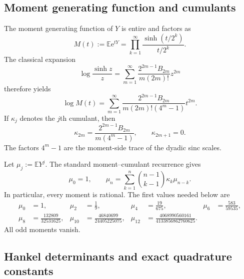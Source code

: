 \documentclass[11pt]{article}
\numberwithin{equation}{section}
\theoremstyle{definition}
\theoremstyle{remark}
\newcommand{\E}{\mathbb E}
\newcommand{\e}{\mathrm e}
\begin{document}
\subsection{Moment generating function and cumulants}

The moment generating function of $Y$ is entire and factors as
\begin{equation}
 M(t):=\E\e^{tY}
 =\prod_{k=1}^{\infty}\frac{\sinh(t/2^k)}{t/2^k}.
 \label{eq:MGF}
\end{equation}
The classical expansion
\begin{equation}
 \log\frac{\sinh z}{z}
 =\sum_{m=1}^{\infty}
 \frac{2^{2m-1}B_{2m}}{m(2m)!}z^{2m}
 \label{eq:logsinh}
\end{equation}
therefore yields
\begin{equation}
 \boxed{
 \log M(t)=\sum_{m=1}^{\infty}
 \frac{2^{2m-1}B_{2m}}{m(2m)!(4^m-1)}t^{2m}.}
 \label{eq:logM}
\end{equation}
If $\kappa_j$ denotes the $j$th cumulant, then
\begin{equation}
 \boxed{
 \kappa_{2m}=\frac{2^{2m-1}B_{2m}}{m(4^m-1)},
 \qquad
 \kappa_{2m+1}=0.}
 \label{eq:cumulants}
\end{equation}
The factors $4^m-1$ are the moment-side trace of the dyadic sinc scales.

Let $\mu_j:=\E Y^j$.  The standard moment--cumulant recurrence gives
\begin{equation}
 \mu_0=1,
 \qquad
 \mu_n=\sum_{k=1}^{n}\binom{n-1}{k-1}\kappa_k\mu_{n-k}.
 \label{eq:moment-recurrence}
\end{equation}
In particular, every moment is rational.  The first values needed below are
\begin{align}
 \mu_0&=1,&
 \mu_2&=\frac19,&
 \mu_4&=\frac{19}{675},&
 \mu_6&=\frac{583}{59535},\label{eq:moments-low}\\
 \mu_8&=\frac{132809}{32531625},&
 \mu_{10}&=\frac{46840699}{24405225075},&
 \mu_{12}&=\frac{4068990560161}{4133856862760625}.\nonumber
\end{align}
All odd moments vanish.

\subsection{Hankel determinants and exact quadrature constants}
\end{document}

